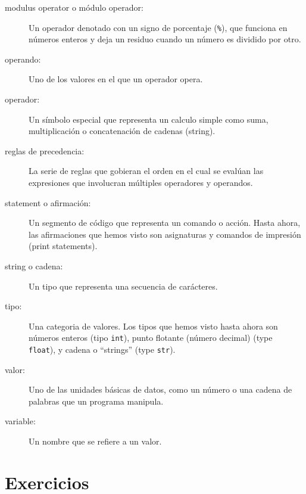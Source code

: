 \begin{ex}
\begin{description}
\item[modulus operator o m\'odulo operador:]  Un operador denotado con un signo de porcentaje
({\tt \%}), que funciona en n\'umeros enteros y deja un residuo cuando un n\'umero es dividido por otro.

\item[operando:]  Uno de los valores en el que un operador opera.

\item[operador:]  Un s\'imbolo especial que representa un calculo simple como suma, multiplicaci\'on o concatenaci\'on de cadenas (string).

\item[reglas de precedencia:]  La serie de reglas que gobieran el orden en el cual se eval\'uan las expresiones que involucran m\'ultiples operadores y operandos.

\item[statement o afirmaci\'on:]  Un segmento de c\'odigo que representa un comando o acci\'on. Hasta ahora, las afirmaciones que hemos visto son asignaturas y comandos de impresi\'on (print statements).

\item[string o cadena:] Un tipo que representa una secuencia de car\'acteres.

\item[tipo:] Una categoria de valores.  Los tipos que hemos visto hasta ahora son n\'umeros enteros (tipo {\tt int}), punto flotante (n\'umero decimal) (type {\tt
float}), y cadena o ``strings'' (type {\tt str}).

\item[valor:]  Uno de las unidades b\'asicas de datos, como un n\'umero o una cadena de palabras que un programa manipula.

\item[variable:]  Un nombre que se refiere a un valor.









\end{description}

\section{Exercicios}


\end{ex}
